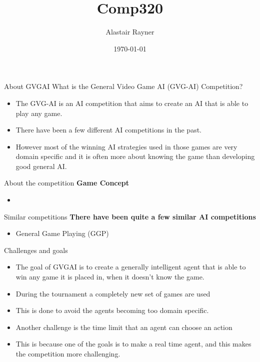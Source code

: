 \documentclass{beamer}
\title{Comp320}
\author{Alastair Rayner}
\date{\today}
\begin{document}
\maketitle


\begin{frame}{About GVGAI}
	  What is the General Video Game AI (GVG-AI) Competition? \pause
	  \begin{itemize}
	      \item The GVG-AI is an AI competition that aims to create an AI that is able to play any game. \pause
	      \item There have been a few different AI competitions in the past. \pause
	      \item However most of the winning AI strategies used in those games are very domain specific and it is often more about knowing the game than developing good general AI. \pause
	  \end{itemize}
\end{frame}


\begin{frame}{About the competition}		
	\textbf{Game Concept} \pause
		\begin{itemize}
			\item 
		\end{itemize}
\end{frame}

\begin{frame}{Similar competitions}	
	\textbf{There have been quite a few similar AI competitions} \pause
		\begin{itemize}
			\item General Game Playing (GGP)
		\end{itemize}
\end{frame}

\begin{frame}{Challenges and goals}		
			\begin{itemize}
			\item The goal of GVGAI is to create a generally intelligent agent that is able to win any game it is placed in, when it doesn't know the game.
			\item During the tournament a completely new set of games are used
			\item This is done to avoid the agents becoming too domain specific.
			\item Another challenge is the time limit that an agent can choose an action
			\item This is because one of the goals is to make a real time agent, and this makes the competition more challenging.
		\end{itemize}
\end{frame}
	
\end{document}
